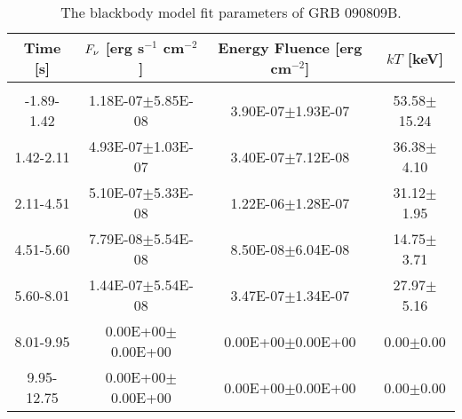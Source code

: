 \begin{table}[h]
\centering
\scriptsize
\label{tab:}
\begin{tabular}{c| c c c}
Time [s] & $F_{\nu}$ [erg s$^{-1}$ cm$^{-2}$] & Energy Fluence [erg cm$^{-2}$] & $kT$ [keV] \\
\hline \hline\\ 

-1.89-1.42 & 1.18E-07$\pm$5.85E-08 & 3.90E-07$\pm$1.93E-07 & 53.58$\pm$15.24 \\ 

1.42-2.11 & 4.93E-07$\pm$1.03E-07 & 3.40E-07$\pm$7.12E-08 & 36.38$\pm$4.10 \\ 

2.11-4.51 & 5.10E-07$\pm$5.33E-08 & 1.22E-06$\pm$1.28E-07 & 31.12$\pm$1.95 \\ 

4.51-5.60 & 7.79E-08$\pm$5.54E-08 & 8.50E-08$\pm$6.04E-08 & 14.75$\pm$3.71 \\ 

5.60-8.01 & 1.44E-07$\pm$5.54E-08 & 3.47E-07$\pm$1.34E-07 & 27.97$\pm$5.16 \\ 

8.01-9.95 & 0.00E+00$\pm$0.00E+00 & 0.00E+00$\pm$0.00E+00 & 0.00$\pm$0.00 \\ 

9.95-12.75 & 0.00E+00$\pm$0.00E+00 & 0.00E+00$\pm$0.00E+00 & 0.00$\pm$0.00 \\ 

\end{tabular}
\caption{The blackbody model fit parameters of GRB 090809B.}
\end{table}


